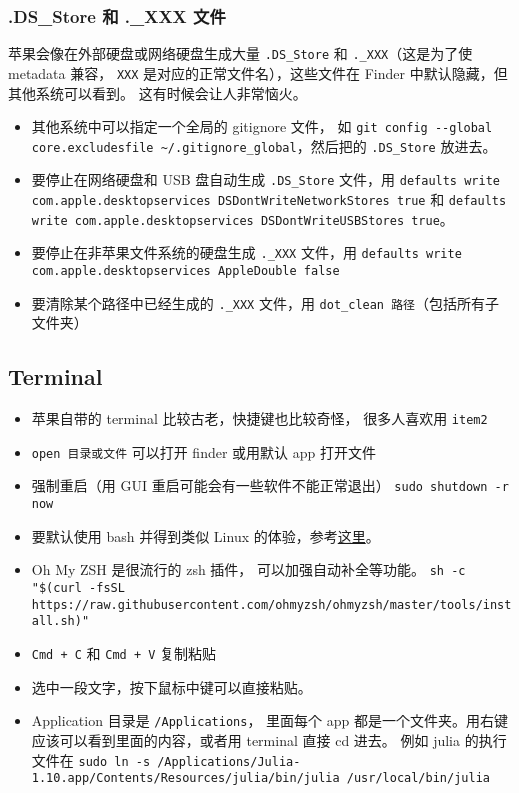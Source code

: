 \subsubsection{.DS_Store 和 ._XXX 文件}
苹果会像在外部硬盘或网络硬盘生成大量 \verb`.DS_Store` 和 \verb`._XXX`（这是为了使 metadata 兼容， \verb`XXX` 是对应的正常文件名），这些文件在 Finder 中默认隐藏，但其他系统可以看到。 这有时候会让人非常恼火。
\begin{itemize}
\item 其他系统中可以指定一个全局的 gitignore 文件， 如 \verb|git config --global core.excludesfile ~/.gitignore_global|，然后把的 \verb`.DS_Store` 放进去。
\item 要停止在网络硬盘和 USB 盘自动生成 \verb`.DS_Store` 文件，用 \verb`defaults write com.apple.desktopservices DSDontWriteNetworkStores true` 和 \verb`defaults write com.apple.desktopservices DSDontWriteUSBStores true`。
\item 要停止在非苹果文件系统的硬盘生成 \verb`._XXX` 文件，用 \verb`defaults write com.apple.desktopservices AppleDouble false`
\item 要清除某个路径中已经生成的 \verb`._XXX` 文件，用 \verb`dot_clean 路径`（包括所有子文件夹）
\end{itemize}

\subsection{Terminal}
\begin{itemize}
\item 苹果自带的 terminal 比较古老，快捷键也比较奇怪， 很多人喜欢用 \verb`item2`
\item \verb`open 目录或文件` 可以打开 finder 或用默认 app 打开文件
\item 强制重启（用 GUI 重启可能会有一些软件不能正常退出） \verb|sudo shutdown -r now|
\item 要默认使用 bash 并得到类似 Linux 的体验，参考\href{https://medium.com/@geraldcroes/the-good-tweak-the-bad-mac-and-the-ugly-terminal-8f18b3c3d687}{这里}。
\item Oh My ZSH 是很流行的 zsh 插件， 可以加强自动补全等功能。 \verb`sh -c "$(curl -fsSL https://raw.githubusercontent.com/ohmyzsh/ohmyzsh/master/tools/install.sh)"`
\item \verb`Cmd + C` 和 \verb`Cmd + V` 复制粘贴
\item 选中一段文字，按下鼠标中键可以直接粘贴。
\item Application 目录是 \verb`/Applications`， 里面每个 app 都是一个文件夹。用右键应该可以看到里面的内容，或者用 terminal 直接 cd 进去。 例如 julia 的执行文件在 \verb`sudo ln -s /Applications/Julia-1.10.app/Contents/Resources/julia/bin/julia /usr/local/bin/julia`
\end{itemize}

